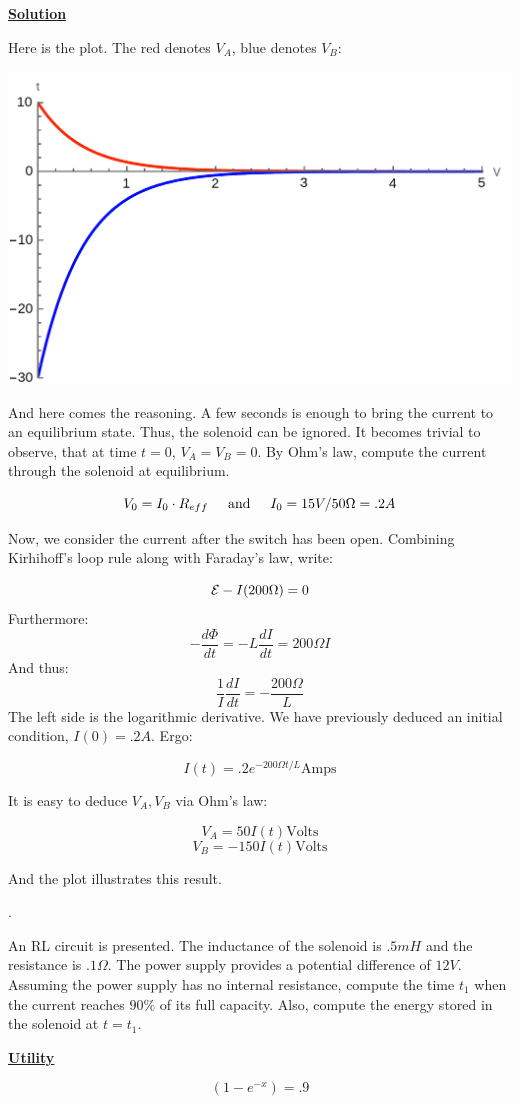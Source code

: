 \documentclass{article}
\newcommand{\new}[1]{
    \vspace{2mm}
    \noindent
    \textbf{
    \underline{#1}}
}
\newcounter{problemcnt}
\newcommand{\Problem}{{
    \vspace{5mm}
    \stepcounter{problemcnt}
    \noindent
    \arabic{problemcnt}. 
}
}
\newcommand{\textAnd}{
    {
        \hspace{5mm}
        \textrm{and}
        \hspace{5mm}
    }
}
\begin{document}
\new{Solution}
Here is the plot. The red denotes $V_A$, blue denotes $V_B$:
\begin{center}
\includegraphics[width = .5\linewidth]{Q6_plot.png}
\end{center}

And here comes the reasoning. 
A few seconds is enough to bring the current to an 
equilibrium state. Thus, the solenoid can be ignored. 
It becomes trivial to observe, that at time $t = 0$, 
$V_A = V_B = 0$. By Ohm's law, compute the current 
through the solenoid at equilibrium. 

\[
    V_0 = I_0\cdot R_{eff} \textAnd
    I_0 = 15V/50\Omega = .2A
\]

Now, we consider the current after the switch has been open. 
Combining Kirhihoff's loop rule along with Faraday's law, write:

\newcommand{\Ohm}{\Omega}

\[
    \EMF - I(200\Ohm) = 0
\]
Furthermore:
\[
    -\frac{d\Phi}{dt} = -L\frac{dI}{dt} = 200\Ohm I  
\]
And thus:
\[
    \frac{1}{I} \frac{dI}{dt} = -\frac{200\Ohm}{L}
\]
The left side is the logarithmic derivative. We have previously 
deduced an initial condition, $I(0) = .2A$. Ergo:

\[
    I(t) = .2e^{-200\Ohm t/L} \textrm{Amps}
\]

It is easy to deduce $V_A, V_B$ via Ohm's law:

\[
    V_A = 50I(t) \textrm{Volts}
\]
\[
    V_B = -150I(t) \textrm{Volts}
\]

And the plot illustrates this result. 



\newpage

\Problem
An RL circuit is presented. 
The inductance of the solenoid is 
$.5mH$ and the resistance is $.1\Omega$. 
The power supply provides a potential difference of $12V$. 
Assuming the power supply has no internal resistance, compute the 
time $t_1$ when the current reaches $90\%$ of its full capacity. 
Also, compute the energy stored in the solenoid at $t = t_1$. 

\new{Utility} 
\[
    (1-e^{-x}) = .9
\]
\end{document}
